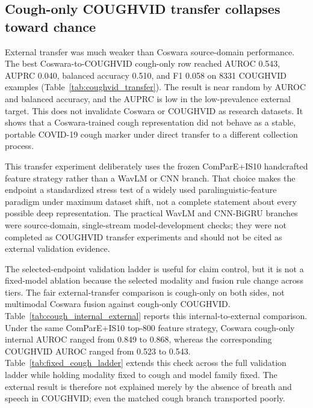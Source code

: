 \documentclass[11pt]{article}
\begin{document}
\subsection*{Cough-only COUGHVID transfer collapses toward chance}

External transfer was much weaker than Coswara source-domain performance. The best Coswara-to-COUGHVID cough-only row reached AUROC 0.543, AUPRC 0.040, balanced accuracy 0.510, and F1 0.058 on 8331 COUGHVID examples (Table~\ref{tab:coughvid_transfer}). The result is near random by AUROC and balanced accuracy, and the AUPRC is low in the low-prevalence external target. This does not invalidate Coswara or COUGHVID as research datasets. It shows that a Coswara-trained cough representation did not behave as a stable, portable COVID-19 cough marker under direct transfer to a different collection process.

This transfer experiment deliberately uses the frozen ComParE+IS10 handcrafted feature strategy rather than a WavLM or CNN branch. That choice makes the endpoint a standardized stress test of a widely used paralinguistic-feature paradigm under maximum dataset shift, not a complete statement about every possible deep representation. The practical WavLM and CNN-BiGRU branches were source-domain, single-stream model-development checks; they were not completed as COUGHVID transfer experiments and should not be cited as external validation evidence.

The selected-endpoint validation ladder is useful for claim control, but it is not a fixed-model ablation because the selected modality and fusion rule change across tiers. The fair external-transfer comparison is cough-only on both sides, not multimodal Coswara fusion against cough-only COUGHVID. Table~\ref{tab:cough_internal_external} reports this internal-to-external comparison. Under the same ComParE+IS10 top-800 feature strategy, Coswara cough-only internal AUROC ranged from 0.849 to 0.868, whereas the corresponding COUGHVID AUROC ranged from 0.523 to 0.543. Table~\ref{tab:fixed_cough_ladder} extends this check across the full validation ladder while holding modality fixed to cough and model family fixed. The external result is therefore not explained merely by the absence of breath and speech in COUGHVID; even the matched cough branch transported poorly.
\end{document}
